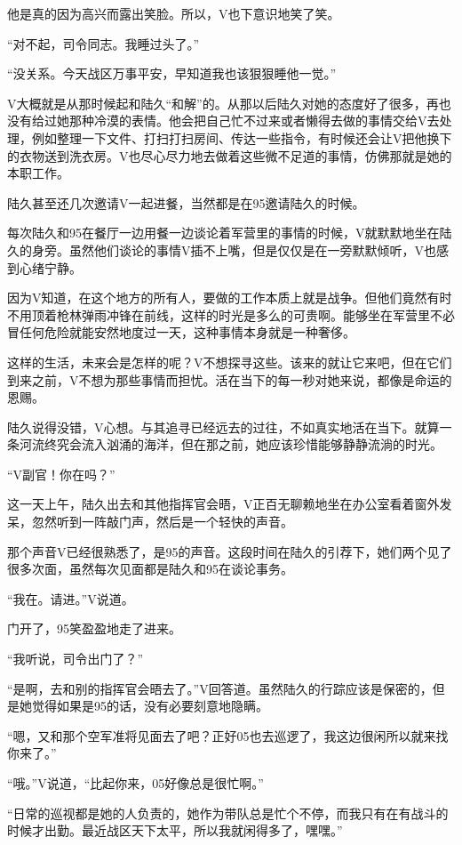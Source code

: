 他是真的因为高兴而露出笑脸。所以，V也下意识地笑了笑。

“对不起，司令同志。我睡过头了。”

“没关系。今天战区万事平安，早知道我也该狠狠睡他一觉。”

V大概就是从那时候起和陆久“和解”的。从那以后陆久对她的态度好了很多，再也没有给过她那种冷漠的表情。他会把自己忙不过来或者懒得去做的事情交给V去处理，例如整理一下文件、打扫打扫房间、传达一些指令，有时候还会让V把他换下的衣物送到洗衣房。V也尽心尽力地去做着这些微不足道的事情，仿佛那就是她的本职工作。

陆久甚至还几次邀请V一起进餐，当然都是在95邀请陆久的时候。

每次陆久和95在餐厅一边用餐一边谈论着军营里的事情的时候，V就默默地坐在陆久的身旁。虽然他们谈论的事情V插不上嘴，但是仅仅是在一旁默默倾听，V也感到心绪宁静。

因为V知道，在这个地方的所有人，要做的工作本质上就是战争。但他们竟然有时不用顶着枪林弹雨冲锋在前线，这样的时光是多么的可贵啊。能够坐在军营里不必冒任何危险就能安然地度过一天，这种事情本身就是一种奢侈。

这样的生活，未来会是怎样的呢？V不想探寻这些。该来的就让它来吧，但在它们到来之前，V不想为那些事情而担忧。活在当下的每一秒对她来说，都像是命运的恩赐。

陆久说得没错，V心想。与其追寻已经远去的过往，不如真实地活在当下。就算一条河流终究会流入汹涌的海洋，但在那之前，她应该珍惜能够静静流淌的时光。

“V副官！你在吗？”

这一天上午，陆久出去和其他指挥官会晤，V正百无聊赖地坐在办公室看着窗外发呆，忽然听到一阵敲门声，然后是一个轻快的声音。

那个声音V已经很熟悉了，是95的声音。这段时间在陆久的引荐下，她们两个见了很多次面，虽然每次见面都是陆久和95在谈论事务。

“我在。请进。”V说道。

门开了，95笑盈盈地走了进来。

“我听说，司令出门了？”

“是啊，去和别的指挥官会晤去了。”V回答道。虽然陆久的行踪应该是保密的，但是她觉得如果是95的话，没有必要刻意地隐瞒。

“嗯，又和那个空军准将见面去了吧？正好05也去巡逻了，我这边很闲所以就来找你来了。”

“哦。”V说道，“比起你来，05好像总是很忙啊。”

“日常的巡视都是她的人负责的，她作为带队总是忙个不停，而我只有在有战斗的时候才出勤。最近战区天下太平，所以我就闲得多了，嘿嘿。”

